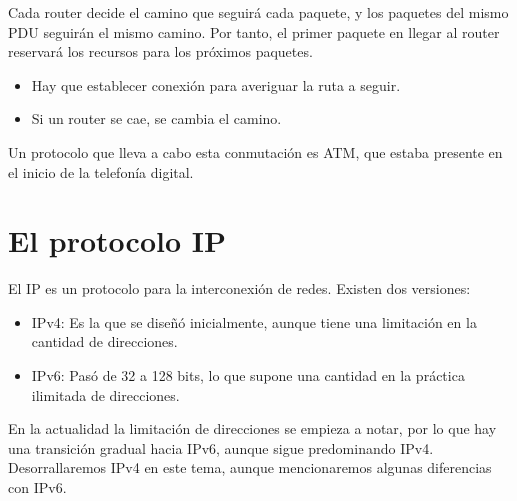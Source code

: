 Cada router decide el camino que seguirá cada paquete, y los paquetes del mismo \acrshort{PDU} seguirán el mismo camino. Por tanto, el primer paquete en llegar al router reservará los recursos para los próximos paquetes.

\begin{itemize}
    \item Hay que establecer conexión para averiguar la ruta a seguir. 
    \item Si un router se cae, se cambia el camino. 
\end{itemize}

Un protocolo que lleva a cabo esta conmutación es \acrfull{ATM}, que estaba presente en el inicio de la telefonía digital.


\section{El protocolo \acrshort{IP}}

El \acrfull{IP} es un protocolo para la interconexión de redes.
Existen dos versiones:
\begin{itemize}
    \item \acrshort{IPv4}: Es la que se diseñó inicialmente, aunque tiene una limitación en la cantidad de direcciones.
    \item \acrshort{IPv6}: Pasó de 32 a 128 bits, lo que supone una cantidad en la práctica ilimitada de direcciones.
\end{itemize}
En la actualidad la limitación de direcciones se empieza a notar, por lo que hay una transición gradual hacia \acrshort{IPv6}, aunque sigue predominando \acrshort{IPv4}. Desorrallaremos \acrshort{IPv4} en este tema, aunque mencionaremos algunas diferencias con \acrshort{IPv6}.

